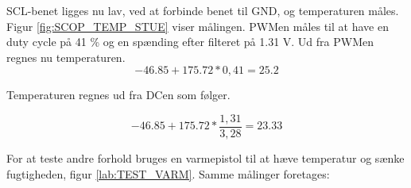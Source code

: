 SCL-benet ligges nu lav, ved at forbinde benet til GND, og temperaturen måles. Figur \ref{fig:SCOP_TEMP_STUE} viser målingen. PWMen måles til at have en duty cycle på 41 \% og en spænding efter filteret på 1.31 V. 
Ud fra PWMen regnes nu temperaturen.
\begin{equation}
-46.85+175.72*0,41=25.2
\end{equation}

Temperaturen regnes ud fra DCen som følger. 

\begin{equation}
-46.85+175.72*\frac{1,31}{3,28}=23.33
\end{equation}


For at teste andre forhold bruges en varmepistol til at hæve temperatur og sænke fugtigheden, figur \ref{lab:TEST_VARM}. 
Samme målinger foretages:


